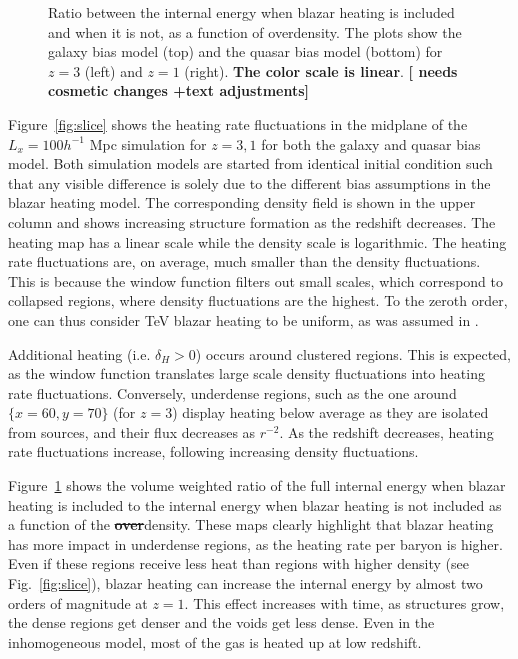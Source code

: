 \documentclass[numberedappendix]{emulateapj}
\newcommand\ALc[1]{{\color{red} \bf #1}} %
\begin{document}
{\begin{figure}
\caption{Ratio between the internal energy when blazar heating is included and when it is not, as a function of overdensity. The plots show the galaxy bias model (top) and the quasar bias model (bottom) for $z=3$ (left) and $z=1$ (right). \ALc{The color scale is linear}.\ALc{[{ needs cosmetic changes +text adjustments}]}}
\label{fig:heating_ratio}
\end{figure}
Figure~\ref{fig:slice} shows the heating rate fluctuations in the midplane of the $L_x=100h^{-1}$ Mpc simulation for $z=3,1$ for both the galaxy and quasar bias model. Both simulation models are started from identical initial condition such that any visible difference is solely due to the different bias assumptions in the blazar heating model. The corresponding density field is shown in the upper column and shows increasing structure formation as the redshift decreases. The heating map has a linear scale while the density scale is logarithmic. The heating rate fluctuations are, on average, much smaller than the density fluctuations. This is because the window function filters out small scales, which correspond to collapsed regions, where density fluctuations are the highest. To the zeroth order, one can thus consider TeV blazar heating to be uniform, as was assumed in \citet{2012ApJ...752...23C}.

Additional heating (i.e. $\delta_H>0$) occurs around clustered regions. This is expected, as the window function translates large scale density fluctuations into heating rate fluctuations. Conversely, underdense regions, such as the one around $\{x=60,y=70\}$ (for $z=3$) display heating below average as they are isolated from sources, and their flux decreases as $r^{-2}$. As the redshift decreases, heating rate fluctuations increase, following increasing density fluctuations.

Figure~\ref{fig:heating_ratio} shows the volume weighted ratio of the full internal energy when blazar heating is included to the internal energy when blazar heating is not included as a function of the \ALc{\sout{over}}density. These maps clearly highlight that blazar heating has more impact in underdense regions, as the heating rate per baryon is higher. Even if these regions receive less heat than regions with higher density (see Fig.~\ref{fig:slice}),  blazar heating can increase the internal energy by almost two orders of magnitude at $z=1$. This effect increases with time, as structures grow, the dense regions get denser and the voids get less dense. Even in the inhomogeneous model, most of the gas is heated up at low redshift.

}
\end{document}
